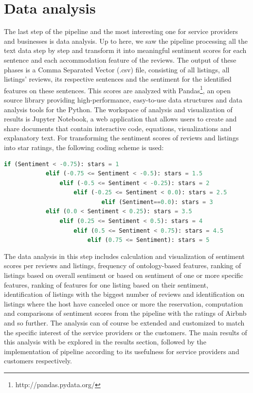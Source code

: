 \section{Data analysis}
% 
%
The last step of the pipeline and the most interesting one for service providers and businesses is data analysis. Up to here, we saw the pipeline processing all the text data step by step and transform it into meaningful sentiment scores for each sentence and each accommodation feature of the reviews. The output of these phases is a Comma Separated Vector (.csv) file, consisting of all listings, all listings' reviews, its respective sentences and the sentiment for the identified features on these sentences. This scores are analyzed with Pandas\footnote{http://pandas.pydata.org/}, an open source library providing high-performance, easy-to-use data structures and data analysis tools for the Python. The workspace  of analysis and visualization of results is Jupyter Notebook, a web application that allows users to create and share documents that contain  interactive code, equations, visualizations and explanatory text. For transforming the sentiment scores of reviews and listings into star ratings, the following coding scheme is used:

\tiny
\begin{lstlisting}[language=python]
	if (Sentiment < -0.75):	stars = 1
  			elif (-0.75 <= Sentiment < -0.5): stars = 1.5
    			elif (-0.5 <= Sentiment < -0.25): stars = 2
    				elif (-0.25 <= Sentiment < 0.0): stars = 2.5
            				elif (Sentiment==0.0): stars = 3
    		elif (0.0 < Sentiment < 0.25): stars = 3.5
    			elif (0.25 <= Sentiment < 0.5): stars = 4
    				elif (0.5 <= Sentiment < 0.75): stars = 4.5
    					elif (0.75 <= Sentiment): stars = 5
\end{lstlisting}
\normalsize
The data  analysis in this step includes calculation and visualization of sentiment scores per reviews and listings, frequency of ontology-based features, ranking of listings based on overall sentiment or based on sentiment of one or more specific features, ranking of features for one listing based on their sentiment, identification of listings with the biggest number of reviews and identification on listings where the host have canceled once or more the reservation, computation and comparisons of sentiment scores from the pipeline with the ratings of Airbnb and so further. The analysis can of course be extended and customized to match the specific interest of the service providers or the customers. The main results of this analysis with be explored in the results section, followed by the implementation of pipeline according to its usefulness for service providers and customers respectively. 
